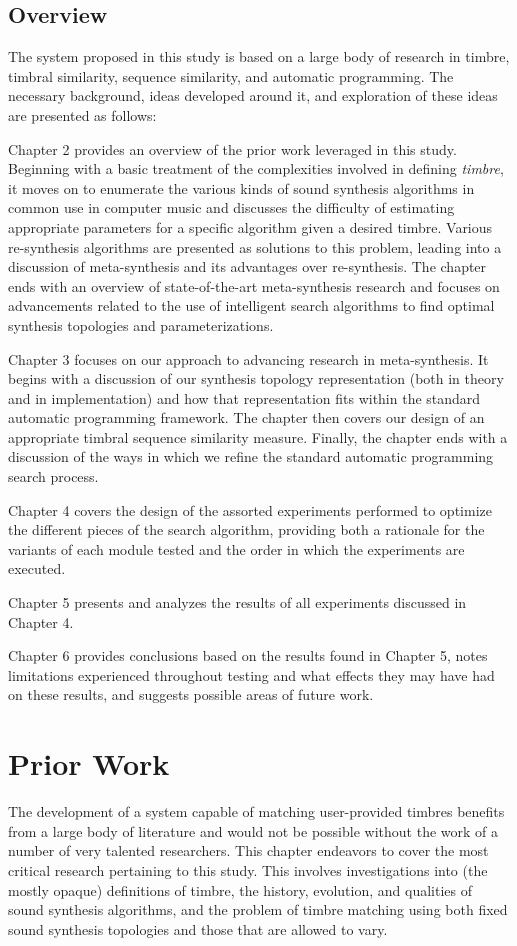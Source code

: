 \documentclass[a4paper,12pt]{report} 	%
\numberwithin{figure}{chapter}
\numberwithin{table}{chapter}
\numberwithin{equation}{chapter}
\begin{document}
\begin{flushleft}
\section{Overview}
The system proposed in this study is based on a large body of research in timbre, timbral similarity, sequence similarity, and automatic programming. The necessary background, ideas developed around it, and exploration of these ideas are presented as follows:

Chapter 2 provides an overview of the prior work leveraged in this study. Beginning with a basic treatment of the complexities involved in defining \emph{timbre}, it moves on to enumerate the various kinds of sound synthesis algorithms in common use in computer music and discusses the difficulty of estimating appropriate parameters for a specific algorithm given a desired timbre. Various re-synthesis algorithms are presented as solutions to this problem, leading into a discussion of meta-synthesis and its advantages over re-synthesis. The chapter ends with an overview of state-of-the-art meta-synthesis research and focuses on advancements related to the use of intelligent search algorithms to find optimal synthesis topologies and parameterizations.

Chapter 3 focuses on our approach to advancing research in meta-synthesis. It begins with a discussion of our synthesis topology representation (both in theory and in implementation) and how that representation fits within the standard automatic programming framework. The chapter then covers our design of an appropriate timbral sequence similarity measure. Finally, the chapter ends with a discussion of the ways in which we refine the standard automatic programming search process.

Chapter 4 covers the design of the assorted experiments performed to optimize the different pieces of the search algorithm, providing both a rationale for the variants of each module tested and the order in which the experiments are executed.

Chapter 5 presents and analyzes the results of all experiments discussed in Chapter 4.

Chapter 6 provides conclusions based on the results found in Chapter 5, notes limitations experienced throughout testing and what effects they may have had on these results, and suggests possible areas of future work.

\vspace*{\QuarterPage}
\chapter{Prior Work} %
The development of a system capable of matching user-provided timbres benefits from a large body of literature and would not be possible without the work of a number of very talented researchers. This chapter endeavors to cover the most critical research pertaining to this study. This involves investigations into (the mostly opaque) definitions of timbre, the history, evolution, and qualities of sound synthesis algorithms, and the problem of timbre matching using both fixed sound synthesis topologies and those that are allowed to vary.


\end{flushleft}
\end{document}

